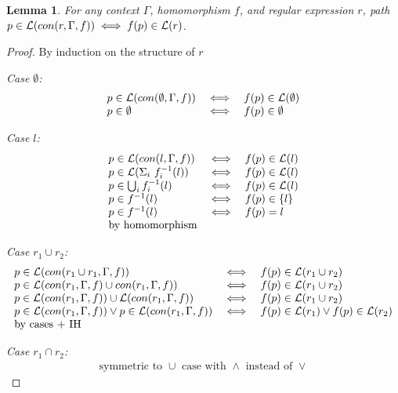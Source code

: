 \documentclass[twocolumn, openany]{sig-alternate-10pt}
\newtheorem{lem}[thm]{Lemma}
\begin{document}
\vspace{1em}
\begin{lem}
  For any context $\Gamma$, homomorphism $f$, and regular expression $r$, 
  path $p \in \mathcal{L}(con(r,\Gamma,f)) \iff f(p) \in \mathcal{L}(r)$.
\end{lem}
\begin{proof}
By induction on the structure of $r$

\emph{Case $\emptyset$:}
  \[ \begin{array}{lll}
    p \in \mathcal{L}(con(\emptyset,\Gamma,f)) &\iff& f(p) \in \mathcal{L}(\emptyset) \\
    p \in \emptyset &\iff& f(p) \in \emptyset \\
  \end{array} \]

\emph{Case $l$:}
  \[ \begin{array}{lll}
    p \in \mathcal{L}(con(l,\Gamma,f)) &\iff& f(p) \in \mathcal{L}(l) \\
    p \in \mathcal{L}(\Sigma_i ~ f_i^{-1}(l)) &\iff& f(p) \in \mathcal{L}(l) \\
    p \in \bigcup_i f_i^{-1}(l) &\iff& f(p) \in \mathcal{L}(l) \\
    p \in f^{-1}(l) &\iff& f(p) \in \{ l \} \\
    p \in f^{-1}(l) &\iff& f(p) = l \\
    \text{by homomorphism} & & \\
  \end{array} \]

\emph{Case $r_1 \cup r_2$:}
  \[ \begin{array}{lll}
    p \in \mathcal{L}(con(r_1 \cup r_1,\Gamma,f)) &\iff& f(p) \in \mathcal{L}(r_1 \cup r_2) \\
    p \in \mathcal{L}(con(r_1,\Gamma,f) \cup con(r_1,\Gamma,f)) &\iff& f(p) \in \mathcal{L}(r_1 \cup r_2) \\
    p \in \mathcal{L}(con(r_1,\Gamma,f)) \cup \mathcal{L}(con(r_1,\Gamma,f)) &\iff& f(p) \in \mathcal{L}(r_1 \cup r_2) \\
    p \in \mathcal{L}(con(r_1,\Gamma,f)) \vee p \in \mathcal{L}(con(r_1,\Gamma,f)) 
       &\iff& 
       f(p) \in \mathcal{L}(r_1) \vee f(p) \in \mathcal{L}(r_2) \\
    \text{by cases + IH} & & \\
  \end{array} \]

\emph{Case $r_1 \cap r_2$:} 
  \[ \begin{array}{c}
    \text{symmetric to } \cup \text{ case with } \wedge \text{ instead of } \vee
  \end{array} \]


\end{proof}
\end{document}
